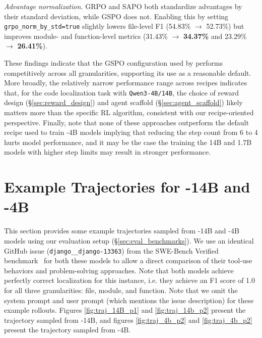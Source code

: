 \emph{Advantage normalization.} GRPO and SAPO both standardize advantages by their standard deviation, while GSPO does not. Enabling this by setting \texttt{grpo\_norm\_by\_std=true} slightly lowers file-level F1 (54.83\% $\to$ 52.73\%) but improves module- and function-level metrics (31.43\% $\to$ \textbf{34.37\%} and 23.29\% $\to$ \textbf{26.41\%}).

These findings indicate that the GSPO configuration used by \methodname performs competitively across all granularities, supporting its use as a reasonable default. More broadly, the relatively narrow performance range across recipes indicates that, for the code localization task with \texttt{Qwen3-4B/14B}, the choice of reward design (\S\ref{sec:reward_design}) and agent scaffold (\S\ref{sec:agent_scaffold}) likely matters more than the specific RL algorithm, consistent with our recipe-oriented perspective. Finally, note that none of these approaches outperform the default recipe used to train \methodname-4B models implying that reducing the step count from 6 to 4 hurts model performance, and it may be the case the training the 14B and 1.7B models with higher step limits may result in stronger performance.
  


\section{Example Trajectories for \methodname-14B and \methodname-4B}\label{appendix:traj_examples}
This section provides some example trajectories sampled from \methodname-14B and \methodname-4B models using our evaluation setup (\S\ref{sec:eval_benchmarks}). We use an identical GitHub issue (\texttt{django\_\_django-13363}) from the SWE-Bench Verified benchmark~\citep{chowdhury2024swebenchverified} for both these models to allow a direct comparison of their tool-use behaviors and problem-solving approaches. Note that both models achieve  perfectly correct localization for this instance, i.e. they achieve an F1 score of 1.0 for all three granularities: file, module, and function. Note that we omit the system prompt and user prompt (which mentions the issue description) for these example rollouts. Figures \ref{fig:traj_14B_p1} and \ref{fig:traj_14b_p2} present the trajectory sampled from \methodname-14B, and figures \ref{fig:traj_4b_p2} and \ref{fig:traj_4b_p2} present the trajectory sampled from \methodname-4B.

